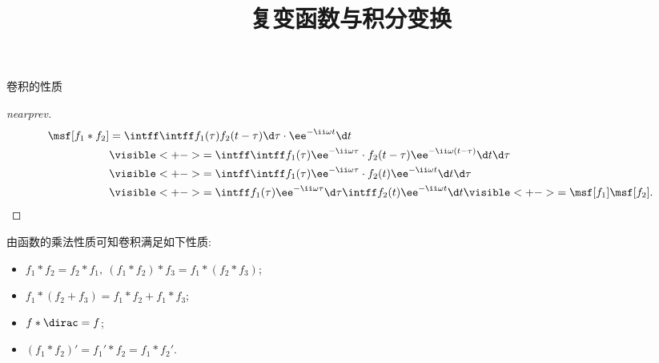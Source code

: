 \documentclass[handout,aspectratio=169]{ctexbeamer}
\title{复变函数与积分变换}
\begin{document}
\begin{frame}{卷积的性质}\small
	\onslide<+->
	\begin{proof}[nearprev]
		\bigdel\bigdel
		\begin{align*}
			\msf[f_1\ast f_2]&=\intff \intff f_1(\tau)f_2(t-\tau)\d \tau \cdot \ee^{-\ii \omega t}\d t\\
			&\visible<+->{=\intff \intff f_1(\tau)\ee^{-\ii \omega \tau}\cdot f_2(t-\tau)\ee^{-\ii \omega (t-\tau)}\d t\d \tau}\\
			&\visible<+->{=\intff \intff f_1(\tau)\ee^{-\ii \omega \tau}\cdot f_2(t)\ee^{-\ii \omega t}\d t\d \tau}\\
			&\visible<+->{=\intff f_1(\tau)\ee^{-\ii \omega \tau}\d\tau\intff f_2(t)\ee^{-\ii \omega t}\d t}\visible<+->{=\msf[f_1]\msf[f_2].\qedhere}
		\end{align*}
	\end{proof}
	\onslide<+->
	由函数的乘法性质可知卷积满足如下性质:
	\begin{itemize}\bf
		\item $f_1\ast f_2=f_2\ast f_1,\ (f_1\ast f_2)\ast f_3=f_1\ast(f_2\ast f_3)$;
		\item $f_1\ast(f_2+f_3)=f_1\ast f_2+f_1\ast f_3$;
		\item $f\ast\dirac=f$;
		\item $(f_1\ast f_2)'=f_1'\ast f_2=f_1\ast f_2'$.
	\end{itemize}
\end{frame}
\end{document}
